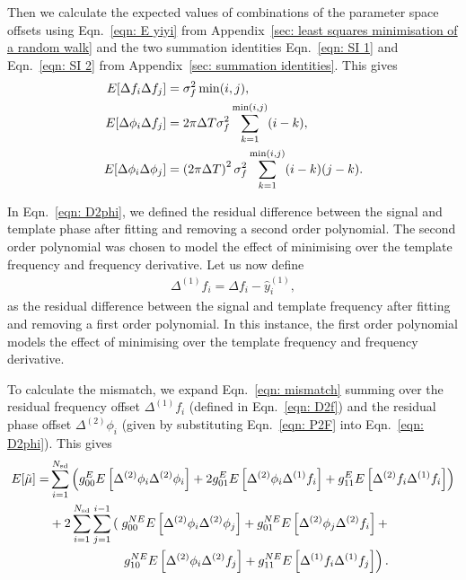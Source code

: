 \documentclass[../full_thesis/full_thesis.tex]{subfiles}
\begin{document}
Then we calculate the expected values of combinations of the parameter space
offsets using Eqn.~\eqref{eqn: E yiyi} from Appendix~\ref{sec: least squares
minimisation of a random walk} and the two summation identities
Eqn.~\eqref{eqn: SI 1} and Eqn.~\eqref{eqn: SI 2} from Appendix~\ref{sec:
summation identities}. This gives
\begin{align}
E[\Delta f_{i}\Delta f_{j}] & = \sigma_{f}^{2} \min(i, j), \label{eqn: E1} \\
E[\Delta\phi_{i}\Delta f_{j}] & = 2 \pi \Delta T \sigma_{f}^{2} \sum_{k=1}^{\min(i, j)}(i-k), \label{eqn: E2}\\
E[\Delta\phi_{i}\Delta\phi_{j}] & =
\left(2\pi\Delta T\right)^{2}\sigma_{f}^{2} \sum_{k=1}^{\min(i, j)}(i-k)(j-k).
\label{eqn: E3}
\end{align}

In Eqn.~\eqref{eqn: D2phi}, we defined the residual difference between the signal
and template phase after fitting and removing a second order polynomial. The
second order polynomial was chosen to model the effect of minimising over the
template frequency and frequency derivative. Let us now define
\begin{align}
\Delta^{(1)}f_i = \Delta f_i - \hat{y}^{(1)}_i,
\label{eqn: D2f}
\end{align}
as the residual difference between the signal and template frequency after
fitting and removing a first order polynomial. In this instance, the first
order polynomial models the effect of minimising over the template
frequency and frequency derivative.

To calculate the mismatch, we expand Eqn.~\eqref{eqn: mismatch} summing over
the residual frequency offset $\Delta^{(1)}f_i$ (defined in Eqn.~\eqref{eqn:
D2f}) and the residual phase offset $\Delta^{(2)}\phi_i$ (given by
substituting Eqn.~\eqref{eqn: P2F} into Eqn.~\eqref{eqn: D2phi}). This gives
\begin{align}
\begin{split}
E[\mutilde] = &
\s{i=1}{\Nsd}\left(g_{00}^{E}E\left[\Delta^{(2)}\phi_{i}\Delta^{(2)}\phi_{i}\right]
+ 2 g_{01}^{E}E\left[\Delta^{(2)}\phi_{i}\Delta^{(1)}\f_{i}\right]
+  g_{11}^{E} E\left[\Delta^{(2)}\f_{i}\Delta^{(1)}\f_{i}\right] \right) \\
& + 2\s{i=1}{\Nsd}\s{j=1}{i-1}\left(\right.
g_{00}^{NE}E\left[\Delta^{(2)}\phi_{i}\Delta^{(2)}\phi_{j}\right] +
g_{01}^{NE}E\left[\Delta^{(2)}\phi_{j}\Delta^{(2)}\f_{i}\right] +  \\
&\hspace{20mm}\left. g_{10}^{NE}E\left[\Delta^{(2)}\phi_{i}\Delta^{(2)}\f_{j}\right] +
g_{11}^{NE} E\left[\Delta^{(1)}\f_{i}\Delta^{(1)}\f_{j}\right] \right).
\end{split}
\end{align}
\end{document}
